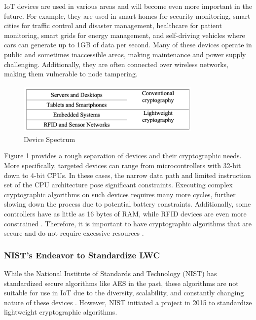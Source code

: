IoT devices are used in various areas and will become even more important in the future. For example, they are used in smart homes for security monitoring, smart cities for traffic control and disaster management, healthcare for patient monitoring, smart grids for energy management, and self-driving vehicles where cars can generate up to 1GB of data per second. Many of these devices operate in public and sometimes inaccessible areas, making maintenance and power supply challenging. Additionally, they are often connected over wireless networks, making them vulnerable to node tampering.

\begin{figure}[h]
    \centering
    \includegraphics[width=9.0cm, height=2.5cm]{media/device_spectrum.png}
    \caption{Device Spectrum}
    \label{fig:device_spectrum}
\end{figure}

Figure \ref{fig:device_spectrum} provides a rough separation of devices and their cryptographic needs. More specifically, targeted devices can range from microcontrollers with 32-bit down to 4-bit CPUs. In these cases, the narrow data path and limited instruction set of the CPU architecture pose significant constraints. Executing complex cryptographic algorithms on such devices requires many more cycles, further slowing down the process due to potential battery constraints. Additionally, some controllers have as little as 16 bytes of RAM, while RFID devices are even more constrained \cite{mckay2016report}. Therefore, it is important to have cryptographic algorithms that are secure and do not require excessive resources \cite{IOTMarkets} \cite{dhanda2020lightweight}.

\subsubsection{NIST's Endeavor to Standardize LWC}
While the National Institute of Standards and Technology (NIST) has standardized secure algorithms like AES in the past, these algorithms are not suitable for use in IoT due to the diversity, scalability, and constantly changing nature of these devices \cite{ekwueme2024lightweight}. However, NIST initiated a project in 2015 to standardize lightweight cryptographic algorithms.

